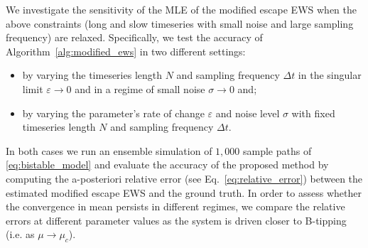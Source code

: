 \documentclass[a4paper,fleqn]{cas-sc}
\begin{document}
We investigate the sensitivity of the MLE of the modified escape EWS when the above constraints (long and slow timeseries with small noise and large sampling frequency) are relaxed.
Specifically, we test the accuracy of Algorithm~\ref{alg:modified_ews} in two different settings:
%
\begin{itemize}
     \item by varying the timeseries length $N$ and sampling frequency $\Delta t$ in the singular limit $\varepsilon\to0$ and in a regime of small noise $\sigma\to0$ and;
     \item by varying the parameter's rate of change $\varepsilon$ and noise level $\sigma$ with fixed timeseries length $N$ and sampling frequency $\Delta t$.
\end{itemize}
%
In both cases we run an ensemble simulation of $1{,}000$ sample paths of \eqref{eq:bistable_model} and evaluate the accuracy of the proposed method by computing the a-posteriori relative error (see Eq.~\eqref{eq:relative_error}) between the estimated modified escape EWS and the ground truth.
In order to assess whether the convergence in mean persists in different regimes, we compare the relative errors at different parameter values as the system is driven closer to B-tipping (i.e. as $\mu\to\mu_c$).
 
\end{document}
